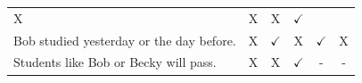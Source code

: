 \documentclass[oneside]{report}
\theoremstyle{definition}
\theoremstyle{definition}
\theoremstyle{definition}
\theoremstyle{remark}
\begin{document}
\begin{longtable}[]{@{}lccccc@{}}
\begin{minipage}[t]{0.05\columnwidth}
X\strut
\end{minipage} & \begin{minipage}[t]{0.05\columnwidth}\centering\strut
X\strut
\end{minipage} & \begin{minipage}[t]{0.09\columnwidth}\centering\strut
X\strut
\end{minipage} & \begin{minipage}[t]{0.12\columnwidth}\centering\strut
\(\checkmark\)\strut
\end{minipage}\tabularnewline
\begin{minipage}[t]{0.47\columnwidth}\raggedright\strut
Bob studied yesterday or the day before.\strut
\end{minipage} & \begin{minipage}[t]{0.05\columnwidth}\centering\strut
X\strut
\end{minipage} & \begin{minipage}[t]{0.05\columnwidth}\centering\strut
\(\checkmark\)\strut
\end{minipage} & \begin{minipage}[t]{0.05\columnwidth}\centering\strut
X\strut
\end{minipage} & \begin{minipage}[t]{0.09\columnwidth}\centering\strut
\(\checkmark\)\strut
\end{minipage} & \begin{minipage}[t]{0.12\columnwidth}\centering\strut
X\strut
\end{minipage}\tabularnewline
\begin{minipage}[t]{0.47\columnwidth}\raggedright\strut
Students like Bob or Becky will pass.\strut
\end{minipage} & \begin{minipage}[t]{0.05\columnwidth}\centering\strut
X\strut
\end{minipage} & \begin{minipage}[t]{0.05\columnwidth}\centering\strut
X\strut
\end{minipage} & \begin{minipage}[t]{0.05\columnwidth}\centering\strut
\(\checkmark\)\strut
\end{minipage} & \begin{minipage}[t]{0.09\columnwidth}\centering\strut
-\strut
\end{minipage} & \begin{minipage}[t]{0.12\columnwidth}\centering\strut
-\strut
\end{minipage}\tabularnewline

\end{longtable}
\end{document}
